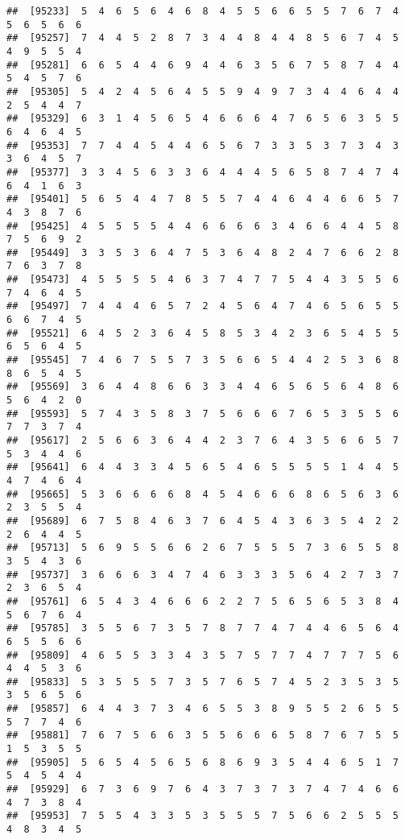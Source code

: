 \documentclass[
]{book}
\begin{document}
\begin{verbatim}
##  [95233]  5  4  6  5  6  4  6  8  4  5  5  6  6  5  5  7  6  7  4  5  6  5  6  6
##  [95257]  7  4  4  5  2  8  7  3  4  4  8  4  4  8  5  6  7  4  5  4  9  5  5  4
##  [95281]  6  6  5  4  4  6  9  4  4  6  3  5  6  7  5  8  7  4  4  5  4  5  7  6
##  [95305]  5  4  2  4  5  6  4  5  5  9  4  9  7  3  4  4  6  4  4  2  5  4  4  7
##  [95329]  6  3  1  4  5  6  5  4  6  6  6  4  7  6  5  6  3  5  5  6  4  6  4  5
##  [95353]  7  7  4  4  5  4  4  6  5  6  7  3  3  5  3  7  3  4  3  3  6  4  5  7
##  [95377]  3  3  4  5  6  3  3  6  4  4  4  5  6  5  8  7  4  7  4  6  4  1  6  3
##  [95401]  5  6  5  4  4  7  8  5  5  7  4  4  6  4  4  6  6  5  7  4  3  8  7  6
##  [95425]  4  5  5  5  5  4  4  6  6  6  6  3  4  6  6  4  4  5  8  7  5  6  9  2
##  [95449]  3  3  5  3  6  4  7  5  3  6  4  8  2  4  7  6  6  2  8  7  6  3  7  8
##  [95473]  4  5  5  5  5  4  6  3  7  4  7  7  5  4  4  3  5  5  6  7  4  6  4  5
##  [95497]  7  4  4  4  6  5  7  2  4  5  6  4  7  4  6  5  6  5  5  6  6  7  4  5
##  [95521]  6  4  5  2  3  6  4  5  8  5  3  4  2  3  6  5  4  5  5  6  5  6  4  5
##  [95545]  7  4  6  7  5  5  7  3  5  6  6  5  4  4  2  5  3  6  8  8  6  5  4  5
##  [95569]  3  6  4  4  8  6  6  3  3  4  4  6  5  6  5  6  4  8  6  5  6  4  2  0
##  [95593]  5  7  4  3  5  8  3  7  5  6  6  6  7  6  5  3  5  5  6  7  7  3  7  4
##  [95617]  2  5  6  6  3  6  4  4  2  3  7  6  4  3  5  6  6  5  7  5  3  4  4  6
##  [95641]  6  4  4  3  3  4  5  6  5  4  6  5  5  5  5  1  4  4  5  4  7  4  6  4
##  [95665]  5  3  6  6  6  6  8  4  5  4  6  6  6  8  6  5  6  3  6  2  3  5  5  4
##  [95689]  6  7  5  8  4  6  3  7  6  4  5  4  3  6  3  5  4  2  2  2  6  4  4  5
##  [95713]  5  6  9  5  5  6  6  2  6  7  5  5  5  7  3  6  5  5  8  3  5  4  3  6
##  [95737]  3  6  6  6  3  4  7  4  6  3  3  3  5  6  4  2  7  3  7  2  3  6  5  4
##  [95761]  6  5  4  3  4  6  6  6  2  2  7  5  6  5  6  5  3  8  4  5  6  7  6  4
##  [95785]  3  5  5  6  7  3  5  7  8  7  7  4  7  4  4  6  5  6  4  6  5  5  6  6
##  [95809]  4  6  5  5  3  3  4  3  5  7  5  7  7  4  7  7  7  5  6  4  4  5  3  6
##  [95833]  5  3  5  5  5  7  3  5  7  6  5  7  4  5  2  3  5  3  5  3  5  6  5  6
##  [95857]  6  4  4  3  7  3  4  6  5  5  3  8  9  5  5  2  6  5  5  5  7  7  4  6
##  [95881]  7  6  7  5  6  6  3  5  5  6  6  6  5  8  7  6  7  5  5  1  5  3  5  5
##  [95905]  5  6  5  4  5  6  5  6  8  6  9  3  5  4  4  6  5  1  7  5  4  5  4  4
##  [95929]  6  7  3  6  9  7  6  4  3  7  3  7  3  7  4  7  4  6  6  4  7  3  8  4
##  [95953]  7  5  5  4  3  3  5  3  5  5  5  7  5  6  6  2  5  5  5  4  8  3  4  5

\end{verbatim}
\end{document}
